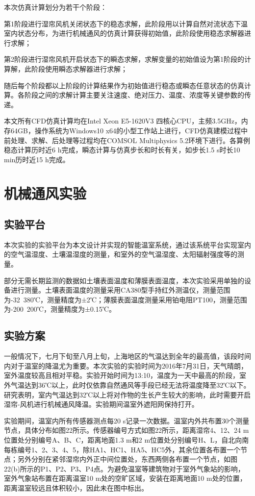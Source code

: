 \begin{enumerate}
\begin{enumerate}
本次仿真计算划分为若干个阶段：

第1阶段进行湿帘风机关闭状态下的稳态求解，此阶段用以计算自然对流状态下温室内状态分布，为进行机械通风的仿真计算获得初始值，此阶段使用稳态求解器进行求解；

第2阶段进行湿帘风机开启状态下的瞬态求解，求解变量的初始值设为第1阶段的计算解，此阶段使用瞬态求解器进行求解；

随后每个阶段都以上阶段的计算结果作为初始值进行稳态或瞬态任意状态的仿真计算。各阶段之间的求解计算主要关注速度、绝对压力、温度、浓度等关键参数的传递。

本文所有CFD仿真计算均在Intel Xeon E5-1620V3 四核心CPU，主频3.5GHz，内存64GB，操作系统为Windows10 x64的小型工作站上进行，CFD仿真建模过程中前处理、求解、后处理等过程均在COMSOL Multiphysics 5.2环境下进行。各算例稳态计算历时近6 h完成，瞬态计算与仿真步长和时长有关，如步长1.5 s时长10 min历时近15 h完成。

\section{机械通风实验}
	\subsection{实验平台}
	本次实验的实验平台为本文设计并实现的智能温室系统，通过该系统平台实现室内的空气温湿度、土壤温湿度的测量，和室外的空气温湿度、太阳辐射强度等的测量。
	
部分无需长期监测的数据如土壤表面温度和薄膜表面温度，本次实验采用单独的设备进行测量。土壤表面温度的测量采用CA380型手持红外测温仪，测量范围为-32~380℃，测量精度为±2℃；薄膜表面温度测量采用铂电阻PT100，测量范围为-200~200℃，测量精度为±0.15℃。

	\subsection{实验方案}
	一般情况下，七月下旬至八月上旬，上海地区的气温达到全年的最高值，该段时间内对于温室的降温尤为重要。本次实验的实验时间为2016年7月31日，天气晴朗，室外温度较高且相对平稳。实验开始时间为13:10，温度为一天中最高的阶段，室外气温达到36℃以上，此时仅依靠自然通风等手段已经无法将温度降至32℃以下。研究表明，室内气温达到32℃以上将对作物的生长产生较大的影响，此时需要开启湿帘-风机进行机械通风降温。实验期间温室外遮阳网保持打开。
	
实验期间，温室内所有传感器测点每20 s记录一次数据。温室内外共布置30个测量节点，具体分布如图22所示。传感器编号方式如图22所示，距离湿帘4、12、24 m位置处分别编号A、B、C，距离地面1.3 m和2 m位置处分别编号H、L，自北向南每栋编号1、2、3、4、5，除HA1、HC1、HA5、HC5外，其余位置各布置一个节点；另外分别在紧邻湿帘内外正中间位置处，东西两侧各布置一个节点，如图22(b)所示的P1、P2、P3、P4点。为避免温室等建筑物对于室外气象站的影响，室外气象站布置在距离温室10 m处的空旷区域，安装在距离地面10 m处的位置，距离温室较远且体积较小，因此未在图中标出。


\end{enumerate}
\end{enumerate}
